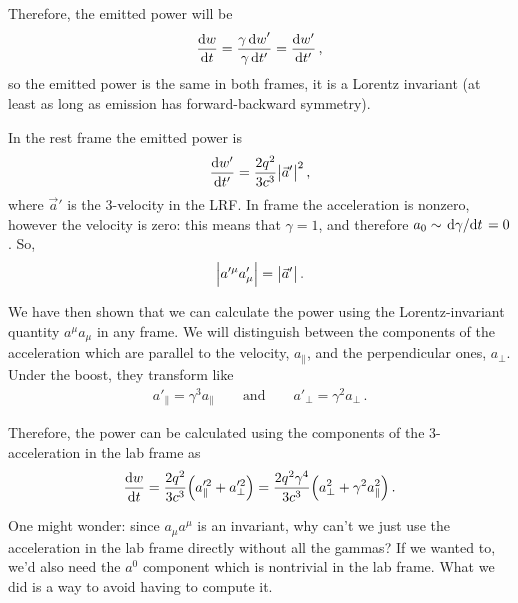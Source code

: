 \documentclass[main.tex]{subfiles}
\begin{document}
Therefore, the emitted power will be 
%
\begin{align}
\dv{w}{t} = \frac{ \gamma \dd{w}'}{ \gamma \dd{t'}} = \dv{w'}{t'}
\,,
\end{align}
%
so the emitted power is the same in both frames, it is a Lorentz invariant (at least as long as emission has forward-backward symmetry). 

In the rest frame the emitted power is 
%
\begin{align}
\dv{w'}{t'} = \frac{2 q^2}{3c^3} \abs{\vec{a}'}^2
\,,
\end{align}
%
where \(\vec{a}'\) is the 3-velocity in the LRF. In frame the acceleration is nonzero, however the velocity is zero: this means that \(\gamma = 1\), and therefore \(a_0 \sim \dv*{\gamma }{t} = 0\). So, 
%
\begin{align}
\abs{a^{\prime \mu } a^{\prime }_{\mu }} = \abs{\vec{a}'}
\,.
\end{align}

We have then shown that we can calculate the power using the Lorentz-invariant quantity \(a^{\mu } a_{\mu }\) in any frame. 
We will distinguish between the components of the acceleration which are parallel to the velocity, \(a_{\parallel}\), and the perpendicular ones, \(a_{\perp}\). 
Under the boost, they transform like 
%
\begin{align}
a'_{\parallel} = \gamma^3 a_{\parallel}
\qquad \text{and} \qquad
a'_{\perp} = \gamma^2 a_\perp
\,.
\end{align}
 
Therefore, the power can be calculated using the components of the 3-acceleration in the lab frame as 
%
\begin{align}
\dv{w}{t} = \frac{2 q^2}{3c^3} \qty(a^{\prime 2}_{\parallel} + a^{\prime 2}_{\perp}) = \frac{2 q^2 \gamma^{4}}{3 c^3} \qty(a^2_{\perp} + \gamma^2 a^2_{\parallel})
\,.
\end{align}

One might wonder: since \(a_{\mu } a^{\mu }\) is an invariant, why can't we just use the acceleration in the lab frame directly without all the gammas? If we wanted to, we'd also need the \(a^{0}\) component which is nontrivial in the lab frame. What we did is a way to avoid having to compute it. 
\end{document}
